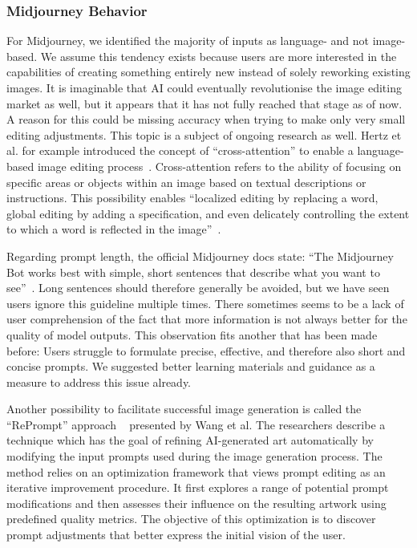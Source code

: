 \subsubsection{Midjourney Behavior}
For Midjourney, we identified the majority of inputs as language- and not image-based.
We assume this tendency exists because users are more interested in the capabilities of creating
something entirely new instead of solely reworking existing images.
It is imaginable that AI could eventually revolutionise the image editing market as well, but
it appears that it has not fully reached that stage as of now.
A reason for this could be missing accuracy when trying to make only very small editing adjustments.
This topic is a subject of ongoing research as well.
Hertz et al\(.\) for example
introduced the concept of ``cross-attention'' to enable a language-based image editing process~\cite{hertz_prompt--prompt_2022}.
Cross-attention refers to the ability of focusing on specific areas or objects within an image
based on textual descriptions or instructions.
This possibility enables ``localized editing by replacing a word, global editing by adding a
specification, and even delicately controlling the extent to which a word is reflected in the
image''~\cite{hertz_prompt--prompt_2022}.

Regarding prompt length, the official Midjourney docs state: ``The Midjourney Bot works best with
simple, short sentences that describe what you want to see''~\cite{midjourney_documentation_2023}.
Long sentences should therefore generally be avoided, but we have seen users ignore this guideline
multiple times.
There sometimes seems to be a lack of user comprehension of the fact that more information is not
always better for the quality of model outputs.
This observation fits another that has been made before:
Users struggle to formulate precise, effective, and therefore also short and concise prompts.
We suggested better learning materials and guidance as a measure to address this issue already.

Another possibility to facilitate successful image generation is called the ``RePrompt'' approach
~\cite{wang_reprompt_2023} presented by Wang et al\(.\)
The researchers describe a technique which has the goal of refining AI-generated art automatically
by modifying the input prompts used during the image generation process.
The method relies on an optimization framework that views prompt editing as an iterative
improvement procedure.
It first explores a range of potential prompt modifications and then assesses their influence on the
resulting artwork using predefined quality metrics.
The objective of this optimization is to discover prompt adjustments that better express the
initial vision of the user.

